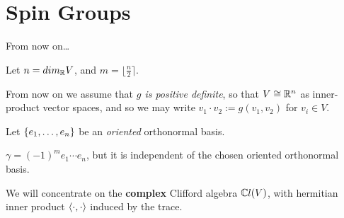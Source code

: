 
\section{Spin Groups}

\begin{frame}{From now on\dots} %

    Let $n = dim_\mathbb R V$, and $m = \lfloor \frac{n}{2} \rceil$.

    From now on we assume that \emph{$g$ is positive definite}, so that $V \cong \mathbb R^n$ as inner-product vector spaces, and so we may write $v_1 \cdot v_2 := g(v_1, v_2)$ for $v_i \in V$. %
    
    Let $\{e_1, \dots, e_n\}$ be an \emph{oriented} orthonormal basis.
    
    $\gamma = (-1)^m e_1 \cdots e_n$, but it is independent of the chosen oriented orthonormal basis. %

    We will concentrate on the \textbf{complex} Clifford algebra $\mathbb C l(V)$, with hermitian inner product $\langle \cdot , \cdot \rangle$ induced by the trace.%
    
\end{frame}

